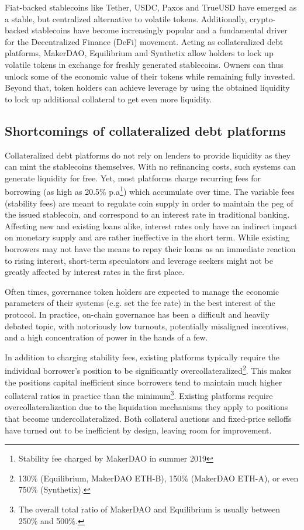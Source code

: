 \documentclass{article}
\begin{document}
Fiat-backed stablecoins like Tether, USDC, Paxos and TrueUSD have emerged as a stable, but centralized alternative to volatile tokens. Additionally, crypto-backed stablecoins have become increasingly popular and a fundamental driver for the Decentralized Finance (DeFi) movement. Acting as collateralized debt platforms, MakerDAO, Equilibrium and Synthetix allow holders to lock up volatile tokens in exchange for freshly generated stablecoins. Owners can thus unlock some of the economic value of their tokens while remaining fully invested. Beyond that, token holders can achieve leverage by using the obtained liquidity to lock up additional collateral to get even more liquidity.
\subsection{Shortcomings of collateralized debt platforms}
Collateralized debt platforms do not rely on lenders to provide liquidity as they can mint the stablecoins themselves. With no refinancing costs, such systems can generate liquidity for free. Yet, most platforms charge recurring fees for borrowing (as high as 20.5\% p.a\footnote{Stability fee charged by MakerDAO in summer 2019}) which accumulate over time. The variable fees (stability fees) are meant to regulate coin supply in order to maintain the peg of the issued stablecoin, and correspond to an interest rate in traditional banking. Affecting new and existing loans alike, interest rates only have an indirect impact on monetary supply and are rather ineffective in the short term. While existing borrowers may not have the means to repay their loans as an immediate reaction to rising interest, short-term speculators and leverage seekers might not be greatly affected by interest rates in the first place.

Often times, governance token holders are expected to manage the economic parameters of their systems (e.g. set the fee rate) in the best interest of the protocol. In practice, on-chain governance has been a difficult and heavily debated topic, with notoriously low turnouts, potentially misaligned incentives, and a high concentration of power in the hands of a few.

In addition to charging stability fees, existing platforms typically require the individual borrower’s position to be significantly overcollateralized\footnote{130\% (Equilibrium, MakerDAO ETH-B), 150\% (MakerDAO ETH-A), or even 750\% (Synthetix).}. This makes the positions capital inefficient since borrowers tend to maintain much higher collateral ratios in practice than the minimum\footnote{The overall total ratio of MakerDAO and Equilibrium is usually between 250\% and 500\%.}. Existing platforms require overcollateralization due to the liquidation mechanisms they apply to positions that become undercollateralized. Both collateral auctions and fixed-price selloffs have turned out to be inefficient by design, leaving room for improvement.
\end{document}
